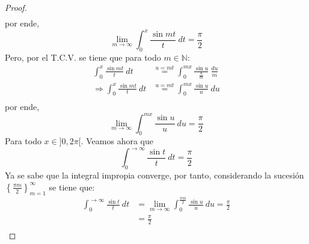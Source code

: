 \documentclass[12pt]{report}
\newcounter{it}
\theoremstyle{largebreak}
\begin{document}
\begin{proof}
\begin{equation*}
\begin{split}
            \end{split}
        \end{equation*}
        por ende,
        \begin{equation*}
            \lim_{m\rightarrow\infty}\int_{0}^{x}\frac{\sin mt}{t}\:dt=\frac{\pi}{2}
        \end{equation*}
        Pero, por el T.C.V. se tiene que para todo $m\in\mathbb{N}$:
        \begin{equation*}
            \begin{split}
                \int_{0}^{x}\frac{\sin mt}{t}\:dt&\overset{u=mt}{=} \int_{0}^{mx}\frac{\sin u}{\frac{u}{m}}\: \frac{du}{m}\\
                \Rightarrow \int_{0}^{x}\frac{\sin mt}{t}\:dt&\overset{u=mt}{=} \int_{0}^{mx}\frac{\sin u}{u}\: du\\
            \end{split}
        \end{equation*}
        por ende,
        \begin{equation*}
            \lim_{m\rightarrow\infty}\int_{0}^{mx}\frac{\sin u}{u}\: du=\frac{\pi}{2}
        \end{equation*}
        Para todo $x\in]0,2\pi[$. Veamos ahora que
        \begin{equation*}
            \int_{0}^{\rightarrow\infty}\frac{\sin t}{t}\:dt=\frac{\pi}{2}
        \end{equation*}
        Ya se sabe que la integral impropia converge, por tanto, considerando la sucesión $\left\{\frac{\pi m}{2}\right\}_{ m=1}^\infty$ se tiene que:
        \begin{equation*}
            \begin{split}
                \int_{0}^{\rightarrow\infty}\frac{\sin t}{t}\:dt&=\lim_{m\rightarrow\infty}\int_{0}^{\frac{\pi m}{2}} \frac{\sin u}{u}\: du=\frac{\pi}{2}\\
                &=\frac{\pi}{2}\\
            \end{split}
        \end{equation*}
    \end{proof}
\end{document}
